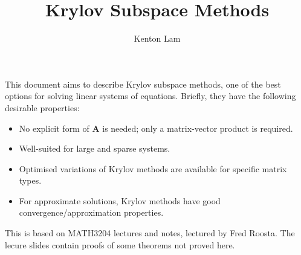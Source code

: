 \documentclass[12pt,a4paper]{article} %
\title{Krylov Subspace Methods}
\author{Kenton Lam}
\begin{document}
\maketitle

This document aims to describe Krylov subspace methods, 
one of the best options for solving linear systems of equations.
Briefly, they have the following desirable properties:
\begin{itemize}
    \item No explicit form of $\mathbf A$ is needed; only a matrix-vector product is required.
    \item Well-suited for large and sparse systems.
    \item Optimised variations of Krylov methods are available for specific matrix types.
    \item For approximate solutions, Krylov methods have good convergence/approximation properties.
\end{itemize}
This is based on MATH3204 lectures and notes, lectured by Fred Roosta. 
The lecure slides contain proofs of some theorems not proved here.
\end{document}
